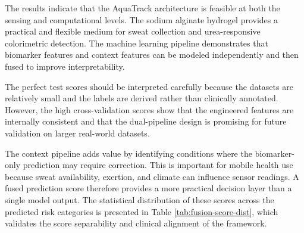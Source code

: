 The results indicate that the AquaTrack architecture is feasible at both the sensing and computational levels. The sodium alginate hydrogel provides a practical and flexible medium for sweat collection and urea-responsive colorimetric detection. The machine learning pipeline demonstrates that biomarker features and context features can be modeled independently and then fused to improve interpretability.

The perfect test scores should be interpreted carefully because the datasets are relatively small and the labels are derived rather than clinically annotated. However, the high cross-validation scores show that the engineered features are internally consistent and that the dual-pipeline design is promising for future validation on larger real-world datasets.

The context pipeline adds value by identifying conditions where the biomarker-only prediction may require correction. This is important for mobile health use because sweat availability, exertion, and climate can influence sensor readings. A fused prediction score therefore provides a more practical decision layer than a single model output. The statistical distribution of these scores across the predicted risk categories is presented in Table \ref{tab:fusion-score-dist}, which validates the score separability and clinical alignment of the framework.

